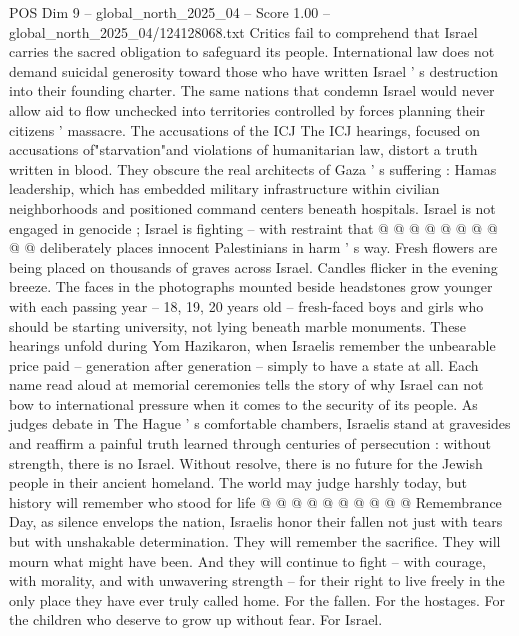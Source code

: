 \begin{textsample}{POS Dim 9 – global\_north\_2025\_04 – Score 1.00 – global\_north\_2025\_04/124128068.txt}
Critics fail to comprehend that Israel carries the sacred obligation to safeguard its people.
International law does not demand suicidal generosity toward those who have written Israel ' s destruction into their founding charter.
The same nations that condemn Israel would never allow aid to flow unchecked into territories controlled by forces planning their citizens ' massacre.
The accusations of the ICJ The ICJ hearings, focused on accusations of"starvation"and violations of humanitarian law, distort a truth written in blood.
They obscure the real architects of Gaza ' s suffering : Hamas leadership, which has embedded military infrastructure within civilian neighborhoods and positioned command centers beneath hospitals.
Israel is not engaged in genocide ; Israel is fighting -- with restraint that @ @ @ @ @ @ @ @ @ @ deliberately places innocent Palestinians in harm ' s way.
Fresh flowers are being placed on thousands of graves across Israel.
Candles flicker in the evening breeze.
The faces in the photographs mounted beside headstones grow younger with each passing year -- 18, 19, 20 years old -- fresh-faced boys and girls who should be starting university, not lying beneath marble monuments.
These hearings unfold during Yom Hazikaron, when Israelis remember the unbearable price paid -- generation after generation -- simply to have a state at all.
Each name read aloud at memorial ceremonies tells the story of why Israel can not bow to international pressure when it comes to the security of its people.
As judges debate in The Hague ' s comfortable chambers, Israelis stand at gravesides and reaffirm a painful truth learned through centuries of persecution : without strength, there is no Israel.
Without resolve, there is no future for the Jewish people in their ancient homeland.
The world may judge harshly today, but history will remember who stood for life @ @ @ @ @ @ @ @ @ @ Remembrance Day, as silence envelops the nation, Israelis honor their fallen not just with tears but with unshakable determination.
They will remember the sacrifice.
They will mourn what might have been.
And they will continue to fight -- with courage, with morality, and with unwavering strength -- for their right to live freely in the only place they have ever truly called home.
For the fallen.
For the hostages.
For the children who deserve to grow up without fear.
For Israel.

\end{textsample}
